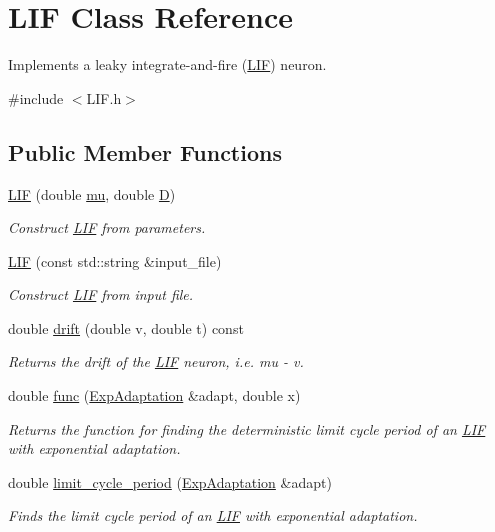 \hypertarget{classLIF}{}\section{L\+IF Class Reference}
\label{classLIF}


Implements a leaky integrate-\/and-\/fire (\hyperlink{classLIF}{L\+IF}) neuron.  




{\ttfamily \#include $<$L\+I\+F.\+h$>$}

\subsection*{Public Member Functions}
\begin{DoxyCompactItemize}
\item 
\hyperlink{classLIF_a368895a753990fa32eb317fde0e9eac5}{L\+IF} (double \hyperlink{classIF_a9f690c993d7b7cd0095e26607503db72}{mu}, double \hyperlink{classIF_a7e0fdbf32975dba0acf8096524885639}{D})
\begin{DoxyCompactList}\small\item\em Construct \hyperlink{classLIF}{L\+IF} from parameters. \end{DoxyCompactList}\item 
\hyperlink{classLIF_a1fcddc7f8aa88974ef0143af4469b547}{L\+IF} (const std\+::string \&input\+\_\+file)
\begin{DoxyCompactList}\small\item\em Construct \hyperlink{classLIF}{L\+IF} from input file. \end{DoxyCompactList}\item 
double \hyperlink{classLIF_a9b298ddf01f78240748137c3328fb1b7}{drift} (double v, double t) const
\begin{DoxyCompactList}\small\item\em Returns the drift of the \hyperlink{classLIF}{L\+IF} neuron, i.\+e. mu -\/ v. \end{DoxyCompactList}\item 
double \hyperlink{classLIF_a70bf790c09810c219134fc22dcacbb18}{func} (\hyperlink{classExpAdaptation}{Exp\+Adaptation} \&adapt, double x)
\begin{DoxyCompactList}\small\item\em Returns the function for finding the deterministic limit cycle period of an \hyperlink{classLIF}{L\+IF} with exponential adaptation. \end{DoxyCompactList}\item 
double \hyperlink{classLIF_aabdcc6b846e7ec6effa76592badeb6cc}{limit\+\_\+cycle\+\_\+period} (\hyperlink{classExpAdaptation}{Exp\+Adaptation} \&adapt)
\begin{DoxyCompactList}\small\item\em Finds the limit cycle period of an \hyperlink{classLIF}{L\+IF} with exponential adaptation. \end{DoxyCompactList}\end{DoxyCompactItemize}
